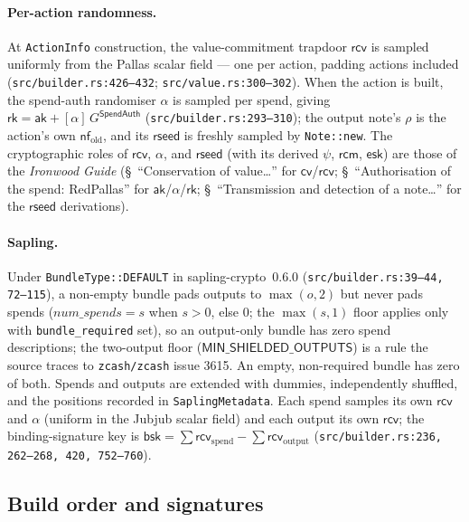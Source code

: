 \documentclass[11pt,a4paper]{article}
\theoremstyle{definition}
\newcommand{\nfsym}{\mathsf{nf}}
\newcommand{\cvsym}{\mathsf{cv}}
\newcommand{\rk}{\mathsf{rk}}
\newcommand{\aksym}{\ensuremath{\mathsf{ak}}}
\newcommand{\rcv}{\ensuremath{\mathsf{rcv}}}
\newcommand{\rcm}{\ensuremath{\mathsf{rcm}}}
\begin{document}
\paragraph{Per-action randomness.} At \texttt{ActionInfo} construction, the
value-commitment trapdoor $\rcv$ is sampled uniformly from the Pallas scalar
field --- one per action, padding actions included
(\texttt{src/builder.rs:426--432}; \texttt{src/value.rs:300--302}). When the
action is built, the spend-auth randomiser $\alpha$ is sampled per spend,
giving $\rk = \aksym + [\alpha]\,G^{\mathsf{SpendAuth}}$
(\texttt{src/builder.rs:293--310}); the output note's $\rho$ is the action's
own $\nfsym_{\mathrm{old}}$, and its $\mathsf{rseed}$ is freshly sampled by
\texttt{Note::new}. The cryptographic roles of $\rcv$, $\alpha$, and
$\mathsf{rseed}$ (with its derived $\psi$, $\rcm$, $\mathsf{esk}$) are those
of the \emph{Ironwood Guide} (\S~``Conservation of value\dots'' for
$\cvsym$/$\rcv$; \S~``Authorisation of the spend: RedPallas'' for
$\aksym$/$\alpha$/$\rk$; \S~``Transmission and detection of a note\dots''
for the $\mathsf{rseed}$ derivations).

\paragraph{Sapling.} Under \texttt{BundleType::DEFAULT} in
\textsf{sapling-crypto}~0.6.0 (\texttt{src/builder.rs:39--44, 72--115}), a
non-empty bundle pads outputs to $\max(o, 2)$ but never pads spends
($\mathit{num\_spends} = s$ when $s > 0$, else $0$; the $\max(s, 1)$ floor
applies only with \texttt{bundle\_required} set), so an output-only bundle
has zero spend descriptions;
the two-output floor ($\mathsf{MIN\_SHIELDED\_OUTPUTS}$) is a rule the
source traces to \texttt{zcash/zcash} issue 3615. An empty, non-required
bundle has zero of both. Spends and outputs are extended with dummies,
independently shuffled, and the positions recorded in
\texttt{SaplingMetadata}. Each spend samples
its own $\rcv$ and $\alpha$ (uniform in the Jubjub scalar field) and each
output its own $\rcv$; the binding-signature key is
$\mathsf{bsk} = \sum \rcv_{\mathrm{spend}} - \sum \rcv_{\mathrm{output}}$
(\texttt{src/builder.rs:236, 262--268, 420, 752--760}).

\subsection{Build order and signatures}\label{sec:pipeline-build}
\end{document}
